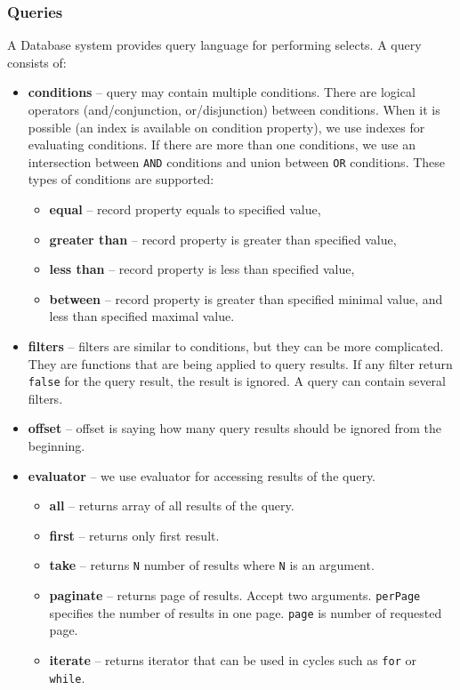\subsubsection{Queries} 
A Database system provides query language for performing selects. A query consists of:
\begin{itemize}
    \item \textbf{conditions} -- query may contain multiple conditions. There are logical operators (and/conjunction, or/disjunction) between conditions. When it is possible (an index is available on condition property), we use indexes for evaluating conditions. If there are more than one conditions, we use an intersection between \texttt{AND} conditions and union between \texttt{OR} conditions. These types of conditions are supported:
    \begin{itemize}
        \item \textbf{equal} -- record property equals to specified value,
        \item \textbf{greater than} -- record property is greater than specified value,
        \item \textbf{less than} -- record property is less than specified value,
        \item \textbf{between} -- record property is greater than specified minimal value, and less than specified maximal value.
    \end{itemize} 
    \item \textbf{filters} -- filters are similar to conditions, but they can be more complicated. They are functions that are being applied to query results. If any filter return \texttt{false} for the query result, the result is ignored. A query can contain several filters.
    \item \textbf{offset} -- offset is saying how many query results should be ignored from the beginning.
    \item \textbf{evaluator} -- we use evaluator for accessing results of the query.
    \begin{itemize}
        \item \textbf{all} -- returns array of all results of the query.
        \item \textbf{first} -- returns only first result.
        \item \textbf{take} -- returns \texttt{N} number of results where \texttt{N} is an argument.
        \item \textbf{paginate} -- returns page of results. Accept two arguments. \texttt{perPage} specifies the number of results in one page. \texttt{page} is number of requested page.
        \item \textbf{iterate} -- returns iterator that can be used in cycles such as \texttt{for} or \texttt{while}.
    \end{itemize}
\end{itemize}  

